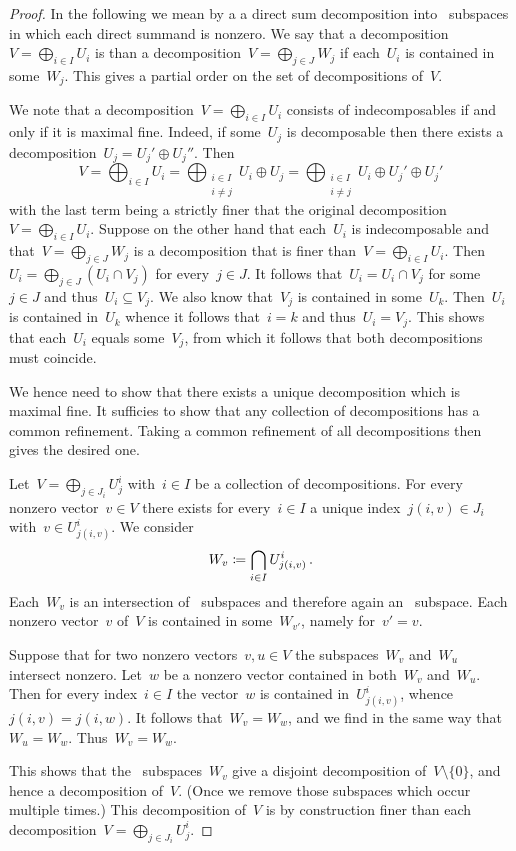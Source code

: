 \documentclass[a4paper,11pt]{scrartcl}
\begin{document}
\begin{proof}
  In the following we mean by a  a direct sum decomposition into~ subspaces in which each direct summand is nonzero.
  We say that a decomposition~$V = \bigoplus_{i \in I} U_i$ is  than a decomposition~$V = \bigoplus_{j \in J} W_j$ if each~$U_i$ is contained in some~$W_j$.
  This gives a partial order on the set of decompositions of~$V$.

  We note that a decomposition~$V = \bigoplus_{i \in I} U_i$ consists of indecomposables if and only if it is maximal fine.
  Indeed, if some~$U_j$ is decomposable then there exists a decomposition~$U_j = U_j' \oplus U_j''$.
  Then
  \[
    V
    =
    \bigoplus_{i \in I} U_i
    =
    \bigoplus_{\substack{i \in I \\ i \neq j}} U_i \oplus U_j
    =
    \bigoplus_{\substack{i \in I \\ i \neq j}} U_i \oplus U_j' \oplus U_j'
  \]
  with the last term being a strictly finer that the original decomposition~$V = \bigoplus_{i \in I} U_i$.
  Suppose on the other hand that each~$U_i$ is indecomposable and that~$V = \bigoplus_{j \in J} W_j$ is a decomposition that is finer than~$V = \bigoplus_{i \in I} U_i$.
  Then~$U_i = \bigoplus_{j \in J} (U_i \cap V_j)$ for every~$j \in J$.
  It follows that~$U_i = U_i \cap V_j$ for some~$j \in J$ and thus~$U_i \subseteq V_j$.
  We also know that~$V_j$ is contained in some~$U_k$.
  Then~$U_i$ is contained in~$U_k$ whence it follows that~$i = k$ and thus~$U_i = V_j$.
  This shows that each~$U_i$ equals some~$V_j$, from which it follows that both decompositions must coincide.

  We hence need to show that there exists a unique decomposition which is maximal fine.
  It sufficies to show that any collection of decompositions has a common refinement.
  Taking a common refinement of all decompositions then gives the desired one.

  Let~$V = \bigoplus_{j \in J_i} U^i_j$ with~$i \in I$ be a collection of decompositions.
  For every nonzero vector~$v \in V$ there exists for every~$i \in I$ a unique index~$j(i,v) \in J_i$ with~$v \in U^i_{j(i,v)}$.
  We consider
  \[
    W_v
    \coloneqq
    \bigcap_{i \in I} U^i_{j(i,v)} \,.
  \]
  Each~$W_v$ is an intersection of~ subspaces and therefore again an~ subspace.
  Each nonzero vector~$v$ of~$V$ is contained in some~$W_{v'}$, namely for~$v' = v$.

  Suppose that for two nonzero vectors~$v, u \in V$ the subspaces~$W_v$ and~$W_u$ intersect nonzero.
  Let~$w$ be a nonzero vector contained in both~$W_v$ and~$W_u$.
  Then for every index~$i \in I$ the vector~$w$ is contained in~$U^i_{j(i,v)}$, whence~$j(i,v) = j(i,w)$.
  It follows that~$W_v = W_w$, and we find in the same way that~$W_u = W_w$.
  Thus~$W_v = W_w$.

  This shows that the~ subspaces~$W_v$ give a disjoint decomposition of~$V \setminus \{0\}$, and hence a decomposition of~$V$.
  (Once we remove those subspaces which occur multiple times.)
  This decomposition of~$V$ is by construction finer than each decomposition~$V = \bigoplus_{j \in J_i} U^i_j$.
\end{proof}
\end{document}
